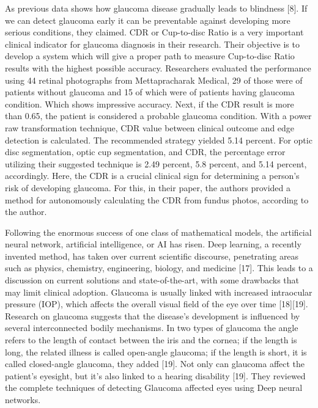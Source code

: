 \vspace{5mm}
\noindent As previous data shows how glaucoma disease gradually leads to blindness [8]. If we can detect glaucoma early it can be preventable against developing more serious conditions, they claimed. CDR or Cup-to-disc Ratio is a very important clinical indicator for glaucoma diagnosis in their research. Their objective is to develop a system which will give a proper path to measure Cup-to-disc Ratio results with the highest possible accuracy. Researchers evaluated the performance using 44 retinal photographs from Mettapracharak Medical, 29 of those were of patients without glaucoma and 15 of which were of patients having glaucoma condition. Which shows impressive accuracy. Next, if the CDR result is more than 0.65, the patient is considered a probable glaucoma condition. With a power raw transformation technique, CDR value between clinical outcome and edge detection is calculated. The recommended strategy yielded 5.14 percent. For optic disc segmentation, optic cup segmentation, and CDR, the percentage error utilizing their suggested technique is 2.49 percent, 5.8 percent, and 5.14 percent, accordingly. Here, the CDR is a crucial clinical sign for determining a person’s risk of developing glaucoma. For this, in their paper, the authors provided a method for autonomously calculating the CDR from fundus photos, according to the author.

\vspace{5mm}
\noindent Following the enormous success of one class of mathematical models, the artificial neural network, artificial intelligence, or AI has risen. Deep learning, a recently invented method, has taken over current scientific discourse, penetrating areas such as physics, chemistry, engineering, biology, and medicine [17]. This leads to a discussion on current solutions and state-of-the-art, with some drawbacks that may limit clinical adoption. Glaucoma is usually linked with increased intraocular pressure (IOP), which affects the overall visual field of the eye over time [18][19]. Research on glaucoma suggests that the disease’s development is influenced by several interconnected bodily mechanisms. In two types of glaucoma the angle refers to the length of contact between the iris and the cornea; if the length is long, the related illness is called open-angle glaucoma; if the length is short, it is called closed-angle glaucoma, they added [19]. Not only can glaucoma affect the patient’s eyesight, but it’s also linked to a hearing disability [19]. They reviewed the complete techniques of detecting Glaucoma affected eyes using Deep neural networks.

